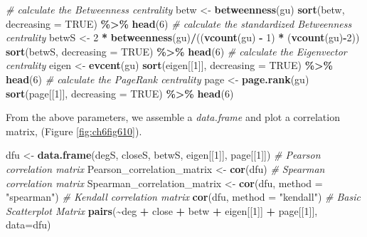 \documentclass[
]{article}
\newenvironment{Shaded}{\begin{snugshade}}{\end{snugshade}}
\newcommand{\AttributeTok}[1]{\textcolor[rgb]{0.13,0.29,0.53}{#1}}
\newcommand{\CommentTok}[1]{\textcolor[rgb]{0.56,0.35,0.01}{\textit{#1}}}
\newcommand{\ConstantTok}[1]{\textcolor[rgb]{0.56,0.35,0.01}{#1}}
\newcommand{\DecValTok}[1]{\textcolor[rgb]{0.00,0.00,0.81}{#1}}
\newcommand{\FunctionTok}[1]{\textcolor[rgb]{0.13,0.29,0.53}{\textbf{#1}}}
\newcommand{\NormalTok}[1]{#1}
\newcommand{\OtherTok}[1]{\textcolor[rgb]{0.56,0.35,0.01}{#1}}
\newcommand{\SpecialCharTok}[1]{\textcolor[rgb]{0.81,0.36,0.00}{\textbf{#1}}}
\newcommand{\StringTok}[1]{\textcolor[rgb]{0.31,0.60,0.02}{#1}}
\begin{document}
\begin{Shaded}
\begin{Highlighting}[]
\CommentTok{\# calculate the Betweenness centrality}
\NormalTok{betw }\OtherTok{\textless{}{-}} \FunctionTok{betweenness}\NormalTok{(gu)}
\FunctionTok{sort}\NormalTok{(betw, }\AttributeTok{decreasing =} \ConstantTok{TRUE}\NormalTok{) }\SpecialCharTok{\%\textgreater{}\%} \FunctionTok{head}\NormalTok{(}\DecValTok{6}\NormalTok{)}
\CommentTok{\# calculate the standardized Betweenness centrality}
\NormalTok{betwS }\OtherTok{\textless{}{-}} \DecValTok{2} \SpecialCharTok{*} \FunctionTok{betweenness}\NormalTok{(gu)}\SpecialCharTok{/}\NormalTok{((}\FunctionTok{vcount}\NormalTok{(gu) }\SpecialCharTok{{-}} \DecValTok{1}\NormalTok{) }\SpecialCharTok{*}\NormalTok{ (}\FunctionTok{vcount}\NormalTok{(gu)}\SpecialCharTok{{-}}\DecValTok{2}\NormalTok{))}
\FunctionTok{sort}\NormalTok{(betwS, }\AttributeTok{decreasing =} \ConstantTok{TRUE}\NormalTok{) }\SpecialCharTok{\%\textgreater{}\%} \FunctionTok{head}\NormalTok{(}\DecValTok{6}\NormalTok{)}
\CommentTok{\# calculate the Eigenvector centrality}
\NormalTok{eigen }\OtherTok{\textless{}{-}} \FunctionTok{evcent}\NormalTok{(gu)}
\FunctionTok{sort}\NormalTok{(eigen[[}\DecValTok{1}\NormalTok{]], }\AttributeTok{decreasing =} \ConstantTok{TRUE}\NormalTok{) }\SpecialCharTok{\%\textgreater{}\%} \FunctionTok{head}\NormalTok{(}\DecValTok{6}\NormalTok{)}
\CommentTok{\# calculate the PageRank centrality}
\NormalTok{page }\OtherTok{\textless{}{-}} \FunctionTok{page.rank}\NormalTok{(gu)}
\FunctionTok{sort}\NormalTok{(page[[}\DecValTok{1}\NormalTok{]], }\AttributeTok{decreasing =} \ConstantTok{TRUE}\NormalTok{) }\SpecialCharTok{\%\textgreater{}\%} \FunctionTok{head}\NormalTok{(}\DecValTok{6}\NormalTok{)}
\end{Highlighting}
\end{Shaded}

\normalsize

From the above parameters, we assemble a \emph{data.frame} and plot a correlation matrix, (Figure \ref{fig:ch6fig610}).

\begin{Shaded}
\begin{Highlighting}[]
\NormalTok{dfu }\OtherTok{\textless{}{-}} \FunctionTok{data.frame}\NormalTok{(degS, closeS, betwS, eigen[[}\DecValTok{1}\NormalTok{]], page[[}\DecValTok{1}\NormalTok{]])}
\CommentTok{\# Pearson correlation matrix}
\NormalTok{Pearson\_correlation\_matrix }\OtherTok{\textless{}{-}} \FunctionTok{cor}\NormalTok{(dfu) }
\CommentTok{\# Spearman correlation matrix}
\NormalTok{Spearman\_correlation\_matrix }\OtherTok{\textless{}{-}} \FunctionTok{cor}\NormalTok{(dfu, }\AttributeTok{method =} \StringTok{"spearman"}\NormalTok{) }
\CommentTok{\# Kendall correlation matrix}
\FunctionTok{cor}\NormalTok{(dfu, }\AttributeTok{method =} \StringTok{"kendall"}\NormalTok{) }
\CommentTok{\# Basic Scatterplot Matrix}
\FunctionTok{pairs}\NormalTok{(}\SpecialCharTok{\textasciitilde{}}\NormalTok{deg }\SpecialCharTok{+}\NormalTok{ close }\SpecialCharTok{+}\NormalTok{ betw }\SpecialCharTok{+}\NormalTok{ eigen[[}\DecValTok{1}\NormalTok{]] }\SpecialCharTok{+}\NormalTok{ page[[}\DecValTok{1}\NormalTok{]],}
      \AttributeTok{data=}\NormalTok{dfu)}
\end{Highlighting}
\end{Shaded}
\end{document}
